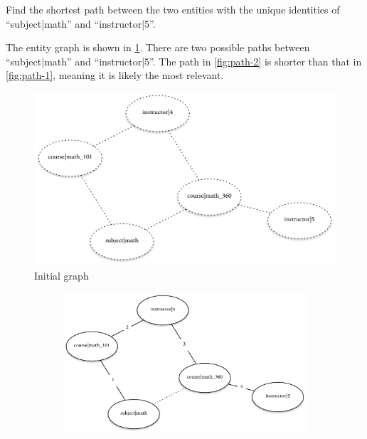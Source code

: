 		\begin{ex}
			Find the shortest path between the two entities with the unique identities of ``subject|math'' and ``instructor|5''.
			
			The entity graph is shown in \cref{fig:path-initial}.  There are two possible paths between ``subject|math'' and ``instructor|5''.  The path in \cref{fig:path-2} is shorter than that in \cref{fig:path-1}, meaning it is likely the most relevant.
			
			\begin{figure}
				\centering
				\includegraphics[scale=0.9]{figures/graphs/path/instructor-to-course-initial}
				
				\caption{Initial graph}
				\label{fig:path-initial}
			\end{figure}
			
			\begin{figure}
				\begin{subfigure}[b]{1.0\linewidth}
					\centering
					\includegraphics[scale=0.9]{figures/graphs/path/instructor-to-course-path-1}
					

\end{subfigure}
\end{figure}
\end{ex}

